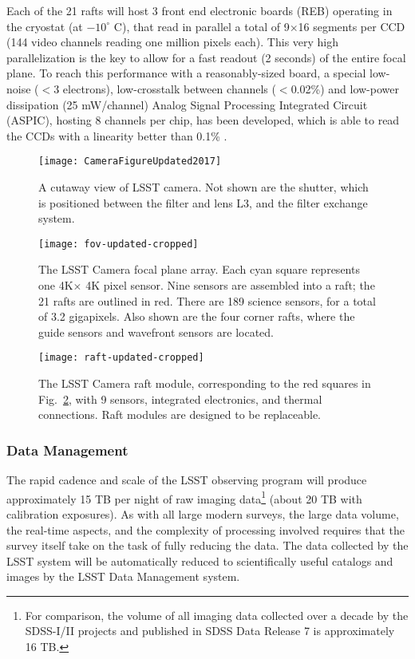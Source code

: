 Each of the 21 rafts will host 3 front end electronic boards (REB) operating in the cryostat
(at $-10^\circ$ C), that read in parallel a total of 9$\times$16 segments per CCD (144 video
channels reading one million pixels each). This very high parallelization is the key to allow
for a fast readout (2 seconds) of the entire focal plane. To reach this performance with a
reasonably-sized board, a special low-noise ($<$3 electrons), low-crosstalk between channels
($<$0.02\%) and low-power dissipation (25 mW/channel) Analog Signal Processing Integrated
Circuit (ASPIC),  hosting 8 channels per chip, has been developed, which is able to read the
CCDs with a linearity better than 0.1\% \citep{1748-0221-12-03-C03017}.

\begin{figure}[t!]
\texttt{[image: CameraFigureUpdated2017]}
\caption{A cutaway view of LSST camera. Not shown are the shutter, which is positioned between the filter and lens L3, and the filter exchange system.}
\label{Fig:camera}
\end{figure}


\begin{figure}[ht]
\texttt{[image: fov-updated-cropped]}
\caption{The LSST Camera focal plane array. Each cyan square represents one
4K$\times$ 4K pixel sensor. Nine sensors are assembled into a
raft; the 21 rafts are outlined in red. There are 189 science sensors, for a total of 3.2 gigapixels. Also shown are the four corner rafts, where the guide sensors and wavefront sensors are located.}
\label{Fig:fov}
\end{figure}

\begin{figure}[ht]
\texttt{[image: raft-updated-cropped]}
\caption{The LSST Camera raft module, corresponding to the red squares
in Fig.~\ref{Fig:fov}, with 9 sensors, integrated electronics,
and thermal connections. Raft modules are designed to be replaceable.}
\label{Fig:raft}
\end{figure}


\subsubsection{ Data Management }
\label{sec:dm}

The rapid cadence and scale of the LSST observing program will produce
approximately 15 TB per night of raw imaging data\footnote{For
  comparison, the volume of all imaging data collected over a decade
  by the SDSS-I/II projects
  and published in SDSS Data Release 7 \citep{2009ApJS..182..543A} is
  approximately 16 TB.} (about 20 TB with calibration exposures). As with
all large modern surveys, the large data volume, the
real-time aspects, and the complexity of processing involved requires
that the survey itself take on the task of fully reducing the data.
The data collected by the LSST
system will be automatically reduced to scientifically useful catalogs
and images by the LSST Data Management
\citep[DM;][]{2017ASPC..512..279J} system.
\\

